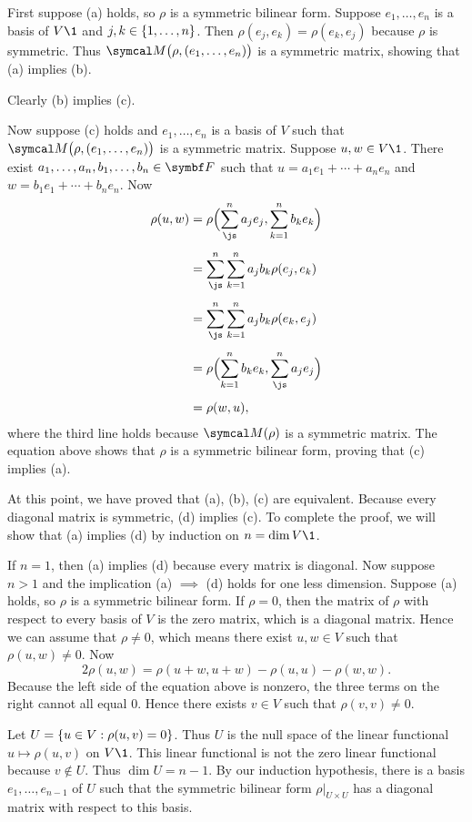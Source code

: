 \proof
First suppose (a) holds, so $\rho$ is a symmetric bilinear form. Suppose $e_1, \ldots, e_n$ is a basis of $V\1$ and
$j,k \in \{1, \ldots, n\}$. Then $\rho(e_j, e_k) = \rho(e_k, e_j)$ because $\rho$ is symmetric. Thus
$\M\paren[\big]{ \rho, (e_1, \ldots, e_n) }$ is a symmetric matrix, showing that (a) implies (b).

Clearly (b) implies (c).

Now suppose (c) holds and $e_1, \ldots, e_n$ is a basis of $V$ such that $\M\paren[\big]{ \rho, (e_1, \ldots, e_n) }$ is a symmetric matrix. Suppose $u, w \in V\1$. There exist $a_1, \ldots, a_n, b_1, \ldots, b_n \in \F{}$ such that
$u = a_1 e_1 + \cdots + a_n e_n$ and $w = b_1 e_1 + \cdots + b_n e_n$. Now
\begin{align*}
\rho(u, w) &= \rho\paren[\Big]{ \sum_{\js}^n a_j e_j, \sum_{k=1}^n b_k e_k } \\[4bp]
&= \sum_{\js}^n \sum_{k=1}^n a_j b_k \rho(e_j, e_k) \\[4bp]
&= \sum_{\js}^n \sum_{k=1}^n a_j b_k \rho(e_k, e_j) \\[4bp]
&= \rho\paren[\Big]{ \sum_{k=1}^n b_k e_k, \sum_{\js}^n a_j e_j } \\[4bp]
&= \rho(w,u),
\end{align*}
where the third line holds because $\M(\rho)$ is a symmetric matrix. The equation above shows that $\rho$ is a symmetric bilinear form, proving that (c) implies (a).

At this point, we have proved that (a), (b), (c) are equivalent. Because every diagonal matrix is symmetric, (d) implies (c). To complete the proof, we will show that (a) implies (d) by induction on $n = \dim V\1$.

If $n = 1$, then (a) implies (d) because every  matrix is diagonal. Now suppose $n > 1$ and the implication (a) $\implies$ (d) holds for one less dimension. Suppose (a) holds, so $\rho$ is a symmetric bilinear form. If $\rho = 0$, then the matrix of $\rho$ with respect to every basis of $V$ is the zero matrix, which is a diagonal matrix. Hence we can assume that $\rho \ne 0$, which means there exist $u, w \in V$ such that $\rho(u, w) \ne 0$. Now
\[
2 \rho(u, w) = \rho(u + w, u+w) - \rho(u, u) - \rho(w,w).
\]
Because the left side of the equation above is nonzero, the three terms on the right cannot all equal $0$. Hence there exists $v \in V$ such that $\rho(v,v) \ne 0$.

Let $U = \{u \in V : \rho(u,v) = 0\}$. Thus $U$ is the null space of the linear functional $u \mapsto \rho(u, v)$ on $V\1$. This linear functional is not the zero linear functional because $v \notin U$. Thus $\dim U = n-1$. By our induction hypothesis, there is a basis
$e_1, \ldots, e_{n-1}$ of $U$ such that the symmetric bilinear form $\rho|_{U \times U}$ has a diagonal matrix with respect to this basis.

